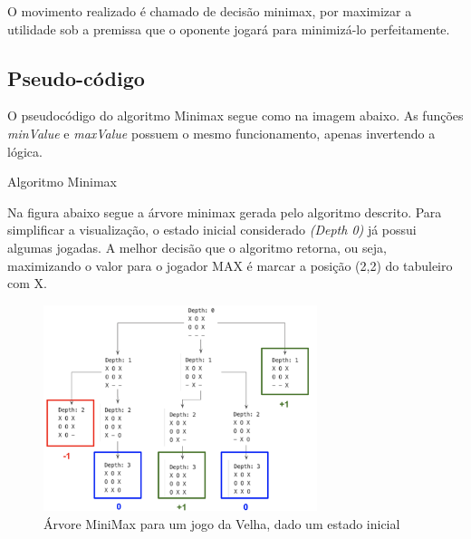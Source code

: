 \documentclass[sigplan,screen]{acmart}
\begin{document}
O movimento realizado é chamado de decisão minimax, por maximizar a utilidade sob a premissa que o oponente jogará para minimizá-lo perfeitamente.

\subsection{Pseudo-código}
O pseudocódigo do algoritmo Minimax segue como na imagem abaixo. 
As funções {\itshape minValue} e {\itshape maxValue} possuem o mesmo funcionamento, apenas invertendo a lógica.

\begin{algorithm}
\DontPrintSemicolon
  \caption{Algoritmo Minimax}
  \label{alg:generator}


\end{algorithm}

Na figura abaixo segue a árvore minimax gerada pelo algoritmo descrito. 
Para simplificar a visualização, o estado inicial considerado {\itshape(Depth 0)} já possui algumas jogadas.
A melhor decisão que o algoritmo retorna, ou seja, maximizando o valor para o jogador MAX é marcar a posição (2,2) do tabuleiro com X.

\begin{figure}[h]
  \includegraphics[width=8cm]{minimax_tree_1.png}
  \caption{Árvore MiniMax para um jogo da Velha, dado um estado inicial}
\end{figure}
\end{document}
